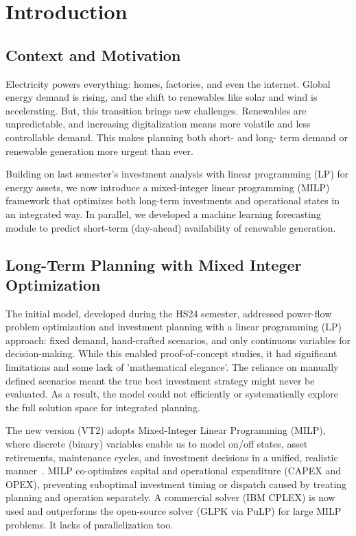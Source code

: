 \newpage
\section{Introduction}
\label{sec:intro_lit}

\subsection{Context and Motivation}
Electricity powers everything: homes, factories, and even the internet. 
Global energy demand is rising, and the shift to renewables like solar and wind is accelerating. But, 
this transition brings new challenges. Renewables are unpredictable, and increasing digitalization means 
more volatile and less controllable demand. This makes planning both short- and long- term demand or 
renewable generation more urgent than ever.

Building on last semester's investment analysis with linear programming (LP) for energy assets, we now 
introduce a mixed-integer linear programming (MILP) framework that optimizes both long-term investments
and operational states in an integrated way. In parallel, we developed a machine learning forecasting 
module to predict short-term (day-ahead) availability of renewable generation.

\subsection{Long-Term Planning with Mixed Integer Optimization}
The initial model, developed during the HS24 semester, addressed power-flow problem optimization and 
investment planning with a linear programming (LP) approach: fixed demand, hand-crafted scenarios, and only 
continuous variables for decision-making. While this enabled proof-of-concept studies, it had significant 
limitations and some lack of 'mathematical elegance'. The reliance on manually defined scenarios meant the true 
best investment strategy might never be evaluated. As a result, the model could not efficiently or systematically 
explore the full solution space for integrated planning.

The new version (VT2) adopts Mixed-Integer Linear Programming (MILP), where discrete (binary) variables 
enable us to model on/off states, asset retirements, maintenance cycles, and investment decisions in a unified, 
realistic manner~\cite{andersson2004power, wood2013power}. MILP co-optimizes capital and operational expenditure 
(CAPEX and OPEX), preventing suboptimal investment timing or dispatch caused by treating planning and operation 
separately. A commercial solver (IBM CPLEX) is now used and outperforms the open-source solver (GLPK via PuLP) 
for large MILP problems. It lacks of parallelization too.

